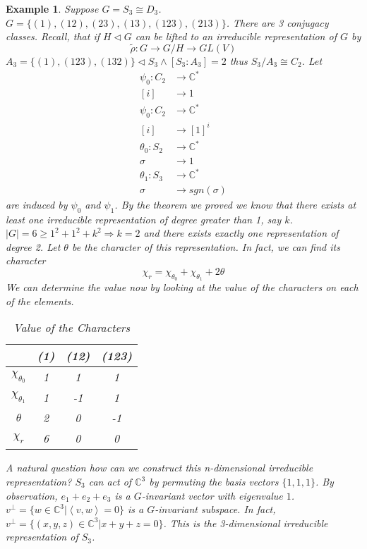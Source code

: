 \documentclass[letterpaper, leqno, 12pt]{article}
\newcommand{\fin}{\qquad \quad \hfill \framebox[1.75mm][l]{\,}}
\providecommand{\abs}[1]{\left\lvert#1\right\rvert}
\providecommand{\ip}[1]{\left\langle #1 \right\rangle}
\newcommand{\bC} {\mathbb{C}}
\theoremstyle{stdthm}
\theoremstyle{stddef}
\newtheorem{eg}[thm]{Example} %
\theoremstyle{stdnonum}
\theoremstyle{stdqands}
\theoremstyle{stdbold}
\begin{document}
\begin{eg}
Suppose $G = S_3 \cong D_3$. $G = \{(1), (12),(23),(13),(123),(213)\}$. There are 3 conjugacy classes. Recall, that if $H \lhd G$ can be lifted to an irreducible representation of $G$ by 
\[ \tilde{\rho}: G \rightarrow G/H \rightarrow GL(V) \]
$A_3 = \{(1), (123), (132)\} \lhd S_3 \wedge [S_3: A_3] = 2$ thus $S_3/A_3 \cong C_2$. Let 
\begin{align*}
\psi_0: C_2 &\rightarrow \bC^*\\
[i]&\rightarrow 1\\
\psi_0: C_2 &\rightarrow \bC^*\\
[i] &\rightarrow [1]^i\\
\theta_0: S_2 &\rightarrow \bC^*\\
\sigma &\rightarrow 1\\
\theta_1: S_3&\rightarrow \bC^*\\
\sigma&\rightarrow sgn(\sigma)
\end{align*}
are induced by $\psi_0$ and $\psi_1$. By the theorem we proved we know that there exists at least one irreducible representation of degree greater than 1, say $k$. $\abs{G} = 6 \geq 1^2 + 1^2 + k^2 \Rightarrow k =2$ and there exists exactly one representation of degree 2. Let $\theta$ be the character of this representation. In fact, we can find its character
\[ \chi_r = \chi_{\theta_0} + \chi_{\theta_1} + 2\theta \]
We can determine the value now by  looking at the value of the characters on each of the elements.  
\begin{table}[htdp]
\caption{Value of the Characters}
\begin{center}
\begin{tabular}{|c|c|c|c|}
\hline
& (1) & (12) &(123)\\
\hline
$\chi_{\theta_0}$ & 1& 1& 1\\
\hline
$\chi_{\theta_1}$ & 1&-1&1\\
\hline
$\theta$ & 2&0&-1\\
\hline
$\chi_r$ & 6&0&0\\
\hline
\end{tabular}
\end{center}

\label{Value of the Characters }
\end{table}
A natural question how can we construct this n-dimensional irreducible representation? $S_3$ can act of $\bC^3$ by permuting the basis vectors $\{1,1,1\}$. By observation, $e_1 + e_2 + e_3$ is a $G$-invariant vector with eigenvalue $1$. $v^\perp = \{w \in \bC^3| \ip{v,w} = 0\}$ is a $G$-invariant subspace. In fact, $v^\perp = \{(x,y,z) \in \bC^3| x+y+z = 0\}$. This is the 3-dimensional irreducible representation of $S_3$. 
\end{eg}
\end{document}
